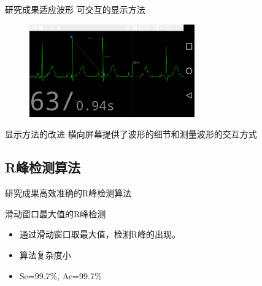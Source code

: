\documentclass[aspectratio=43,fleqn]{beamer}
\begin{document}
\begin{frame}{研究成果}{适应波形 可交互的显示方法}
	\begin{figure}[ht]
		\begin{center}
			\includegraphics[height=4cm]{fig3.png}
		\end{center}
	\end{figure}
	\begin{block}{显示方法的改进}
		横向屏幕提供了波形的细节和测量波形的交互方式
	\end{block}
\end{frame}

\subsection{R峰检测算法}
\begin{frame}{研究成果}{高效准确的R峰检测算法}
	\begin{block}{滑动窗口最大值的R峰检测}
		\begin{itemize}
			\item 通过滑动窗口取最大值，检测R峰的出现。
			\item 算法复杂度小
			\item Se=99.7\%, Ac=99.7\%
		\end{itemize}
	\end{block}
\end{frame}
\end{document}
